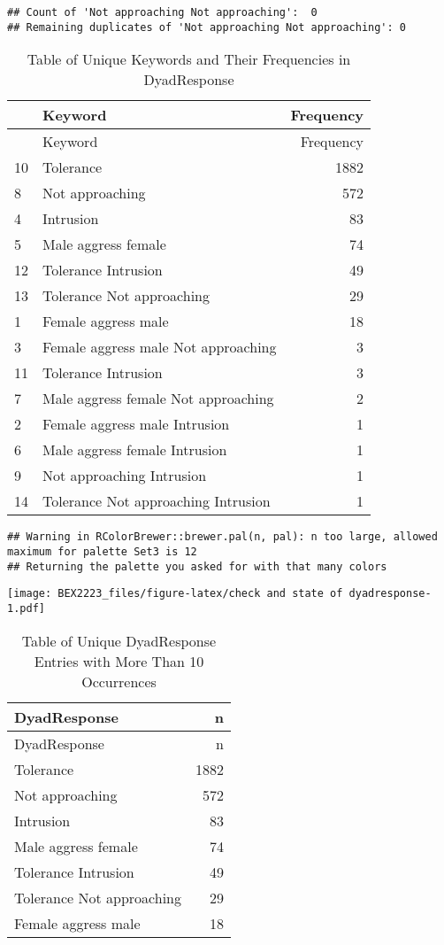 \documentclass[
]{article}
\begin{document}
\begin{verbatim}
## Count of 'Not approaching Not approaching':  0 
## Remaining duplicates of 'Not approaching Not approaching': 0
\end{verbatim}

\begin{longtable}[]{@{}llr@{}}
\caption{Table of Unique Keywords and Their Frequencies in
DyadResponse}\tabularnewline
\toprule
& Keyword & Frequency \\
\midrule
\endfirsthead
\toprule
& Keyword & Frequency \\
\midrule
\endhead
10 & Tolerance & 1882 \\
8 & Not approaching & 572 \\
4 & Intrusion & 83 \\
5 & Male aggress female & 74 \\
12 & Tolerance Intrusion & 49 \\
13 & Tolerance Not approaching & 29 \\
1 & Female aggress male & 18 \\
3 & Female aggress male Not approaching & 3 \\
11 & Tolerance Intrusion & 3 \\
7 & Male aggress female Not approaching & 2 \\
2 & Female aggress male Intrusion & 1 \\
6 & Male aggress female Intrusion & 1 \\
9 & Not approaching Intrusion & 1 \\
14 & Tolerance Not approaching Intrusion & 1 \\
\bottomrule
\end{longtable}

\begin{verbatim}
## Warning in RColorBrewer::brewer.pal(n, pal): n too large, allowed maximum for palette Set3 is 12
## Returning the palette you asked for with that many colors
\end{verbatim}

\texttt{[image: BEX2223\_files/figure-latex/check and state of dyadresponse-1.pdf]}

\begin{longtable}[]{@{}lr@{}}
\caption{Table of Unique DyadResponse Entries with More Than 10
Occurrences}\tabularnewline
\toprule
DyadResponse & n \\
\midrule
\endfirsthead
\toprule
DyadResponse & n \\
\midrule
\endhead
Tolerance & 1882 \\
Not approaching & 572 \\
Intrusion & 83 \\
Male aggress female & 74 \\
Tolerance Intrusion & 49 \\
Tolerance Not approaching & 29 \\
Female aggress male & 18 \\
\bottomrule
\end{longtable}
\end{document}
